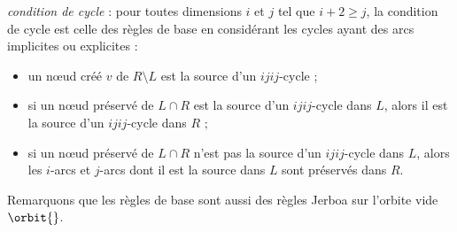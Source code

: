\begin{itemize}
	      \emph{condition de cycle} : pour toutes dimensions $i$ et $j$ tel que $i+2 \geq j$, la condition de cycle est celle des règles de base en considérant les cycles ayant des arcs implicites ou explicites :
	      \begin{itemize}
		      \item un nœud créé $v$ de $R \setminus L$ est la source d'un $ijij$-cycle ;
		      \item si un nœud préservé de $L \cap R$ est la source d'un $ijij$-cycle dans $L$, alors il est la source d'un $ijij$-cycle dans $R$ ;
		      \item si un nœud préservé de $L \cap R$ n'est pas la source d'un $ijij$-cycle dans $L$, alors les $i$-arcs et $j$-arcs dont il est la source dans $L$ sont préservés dans $R$.
	      \end{itemize}
\end{itemize}


Remarquons que les règles de base sont aussi des règles Jerboa sur l'orbite vide $\orbit{}$.


